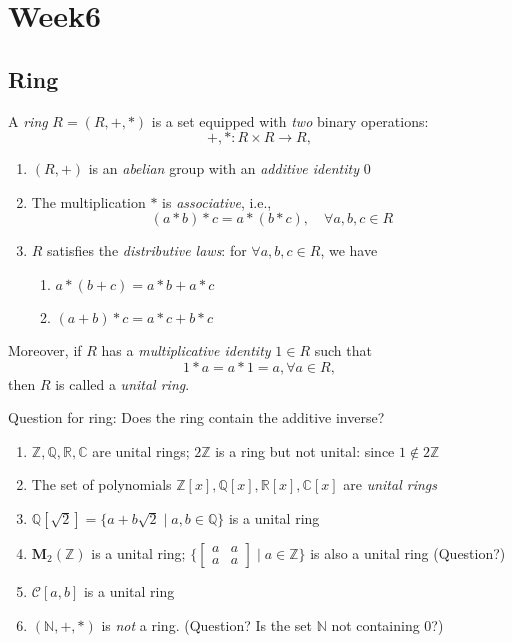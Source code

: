 
\chapter{Week6}

\section{Ring}
\begin{definition}[Ring]
A \emph{ring} $R=(R,+,*)$ is a set equipped with \emph{two} binary operations:
\[
+,*:R\times R\to R,
\]
\begin{enumerate}
\item
$(R,+)$ is an \emph{abelian} group with an \emph{additive identity} $0$
\item
The multiplication $*$ is \emph{associative}, i.e.,
\[
(a*b)*c = a*(b*c),\quad
\forall a,b,c\in R
\]
\item
$R$ satisfies the \emph{distributive laws}: for $\forall a,b,c\in R$, we have
\begin{enumerate}
\item
$a*(b+c) = a*b + a*c$
\item
$(a+b)*c = a*c + b*c$
\end{enumerate}
\end{enumerate}
Moreover, if $R$ has a \emph{multiplicative identity} $1\in R$ such that
\[
1*a=a*1=a,\forall a\in R,
\]
then $R$ is called a \emph{unital ring}.
\end{definition}
Question for ring: Does the ring contain the additive inverse?
\begin{example}
\begin{enumerate}
\item
$\mathbb{Z},\mathbb{Q},\mathbb{R},\mathbb{C}$ are unital rings; $2\mathbb{Z}$ is a ring but not unital: since $1\notin2\mathbb{Z}$
\item
The set of polynomials $\mathbb{Z}[x],\mathbb{Q}[x],\mathbb{R}[x],\mathbb{C}[x]$ are \emph{unital rings}
\item
$\mathbb{Q}[\sqrt{2}] = \{a+b\sqrt{2}\mid a,b\in\mathbb{Q}\}$ is a unital ring
\item
$\bm M_2(\mathbb{Z})$ is a unital ring; $\{\begin{bmatrix}
a&a\\a&a
\end{bmatrix}\mid a\in\mathbb{Z}\}$ is also a unital ring (Question?)
\item
$\mathcal{C}[a,b]$ is a unital ring
\item
$(\mathbb{N},+,*)$ is \emph{not} a ring. (Question? Is the set $\mathbb{N}$ not containing $0$?)
\end{enumerate}
\end{example}
